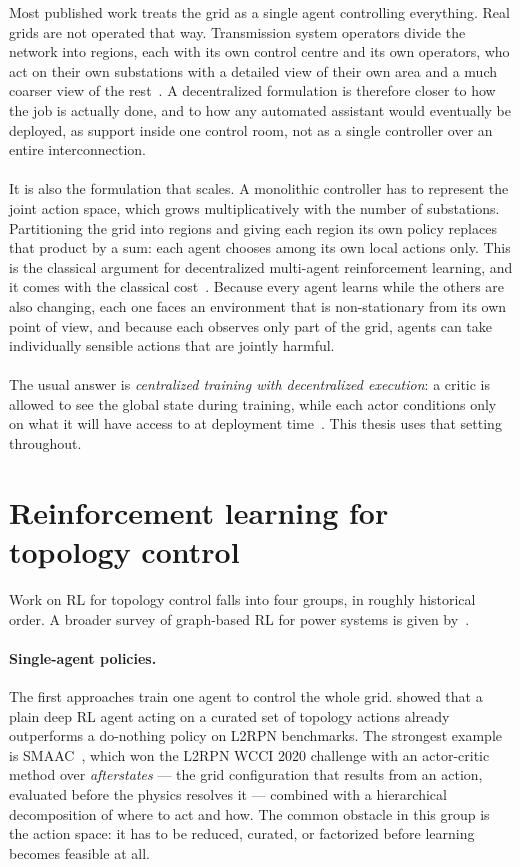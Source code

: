 Most published work treats the grid as a single agent controlling everything.
Real grids are not operated that way. Transmission system operators divide the
network into regions, each with its own control centre and its own operators,
who act on their own substations with a detailed view of their own area and a
much coarser view of the rest~\cite{viebahn2022ai}. A decentralized formulation
is therefore closer to how the job is actually done, and to how any automated
assistant would eventually be deployed, as support inside one control room,
not as a single controller over an entire interconnection.
\\
\\
It is also the formulation that scales. A monolithic controller has to represent
the joint action space, which grows multiplicatively with the number of
substations. Partitioning the grid into regions and giving each region its own
policy replaces that product by a sum: each agent chooses among its own local
actions only. This is the classical argument for decentralized multi-agent
reinforcement learning, and it comes with the classical
cost~\cite{tan1993independent}. Because every agent learns while the others are
also changing, each one faces an environment that is non-stationary from its own
point of view, and because each observes only part of the grid, agents can take
individually sensible actions that are jointly harmful.
\\
\\
The usual answer is \emph{centralized training with decentralized execution}: a
critic is allowed to see the global state during training, while each actor
conditions only on what it will have access to at deployment
time~\cite{lowe2017maddpg,yu2022mappo}. This thesis uses that setting throughout.

\section{Reinforcement learning for topology control}
\label{sec:intro-related-work}

Work on RL for topology control falls into four groups, in roughly historical
order. A broader survey of graph-based RL for power systems is given
by~\textcite{hassouna2024survey}.

\paragraph{Single-agent policies.}
The first approaches train one agent to control the whole grid.
\textcite{subramanian2021exploring} showed that a plain deep RL agent acting on a
curated set of topology actions already outperforms a do-nothing policy on
L2RPN benchmarks. The strongest example is
SMAAC~\cite{yoon2021smaac}, which won the L2RPN WCCI 2020 challenge with an
actor-critic method over \emph{afterstates} --- the grid configuration that
results from an action, evaluated before the physics resolves it --- combined
with a hierarchical decomposition of where to act and how. The common obstacle
in this group is the action space: it has to be reduced, curated, or factorized
before learning becomes feasible at all.

